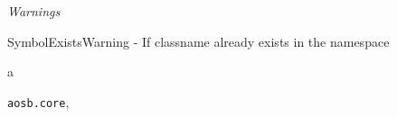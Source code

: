 \documentclass[letterpaper,10pt,english]{sphinxmanual}
\begin{document}
\begin{fulllineitems}
\begin{DUlineblock}{0em}
\item[] \emph{Warnings}
\item[]
\begin{DUlineblock}{\DUlineblockindent}
\item[] SymbolExistsWarning - If classname already exists in the namespace
\end{DUlineblock}
\end{DUlineblock}

\end{fulllineitems}



\renewcommand{\indexname}{Python Module Index}
\begin{theindex}
\def\bigletter#1{{\Large\sffamily#1}\nopagebreak\vspace{1mm}}
\bigletter{a}
\item {\texttt{aosb.core}}, \pageref{modules/index:module-aosb.core}
\end{theindex}

\renewcommand{\indexname}{Index}
\printindex
\end{document}

